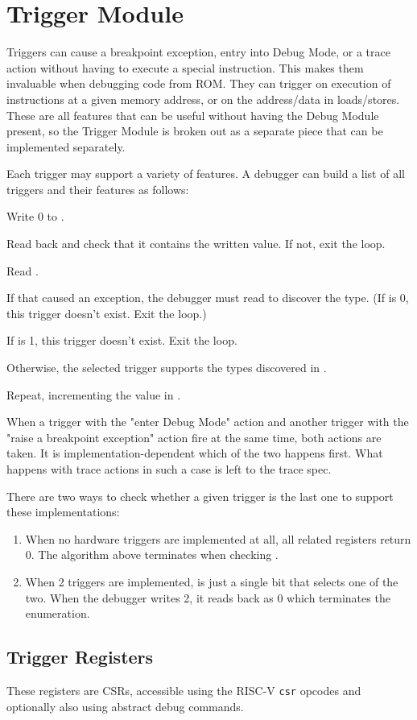 \chapter{Trigger Module}
\label{sec:trigger}

Triggers can cause a breakpoint exception, entry into Debug Mode, or a trace action
without having to execute a special instruction. This makes them invaluable
when debugging code from ROM. They can trigger on execution of instructions at
a given memory address, or on the address/data in loads/stores.  These are all
features that can be useful without having the Debug Module present, so the
Trigger Module is broken out as a separate piece that can be implemented
separately.

\begin{steps}{Each trigger may support a variety of features. A debugger can
    build a list of all triggers and their features as follows:}
\item Write 0 to \Rtselect.
\item Read back \Rtselect and check that it contains the written value. If not,
    exit the loop.
\item Read \Rtinfo.
\item If that caused an exception, the debugger must read \Rtdataone to
    discover the type. (If \Ftype is 0, this trigger doesn't exist. Exit the
    loop.)
\item If \Finfo is 1, this trigger doesn't exist. Exit the loop.
\item Otherwise, the selected trigger supports the types discovered in \Finfo.
\item Repeat, incrementing the value in \Rtselect.
\end{steps}

When a trigger with the "enter Debug Mode" action and another trigger with the
"raise a breakpoint exception" action fire at the same time, both actions are
taken. It is implementation-dependent which of the two happens first. What
happens with trace actions in such a case is left to the trace spec.

\begin{commentary}
    There are two ways to check whether a given trigger is the last one to
    support these implementations:
    \begin{enumerate}
        \item When no hardware triggers are implemented at all, all related
            registers return 0. The algorithm above terminates when checking
            \Ftype.
        \item When 2 triggers are implemented, \Rtselect is just a single bit
            that selects one of the two. When the debugger writes 2, it reads
            back as 0 which terminates the enumeration.
    \end{enumerate}
\end{commentary}

\section{Trigger Registers}

These registers are CSRs, accessible using the RISC-V {\tt csr} opcodes and
optionally also using abstract debug commands.


